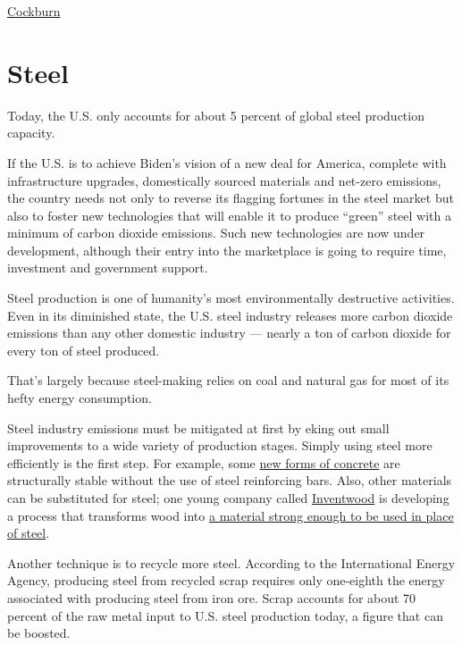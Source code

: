 \documentclass[
]{book}
\begin{document}
\href{https://www.independent.co.uk/climate-change/news/wood-construction-concrete-steel-climate-b1796342.html}{Cockburn}

\hypertarget{steel}{%
\chapter{Steel}\label{steel}}

Today, the U.S. only accounts for about 5 percent of global steel production capacity.

If the U.S. is to achieve Biden's vision of a new deal for America, complete with infrastructure upgrades, domestically sourced materials and net-zero emissions, the country needs not only to reverse its flagging fortunes in the steel market but also to foster new technologies that will enable it to produce ``green'' steel with a minimum of carbon dioxide emissions. Such new technologies are now under development, although their entry into the marketplace is going to require time, investment and government support.

Steel production is one of humanity's most environmentally destructive activities. Even in its diminished state, the U.S. steel industry releases more carbon dioxide emissions than any other domestic industry --- nearly a ton of carbon dioxide for every ton of steel produced.

That's largely because steel-making relies on coal and natural gas for most of its hefty energy consumption.

Steel industry emissions must be mitigated at first by eking out small improvements to a wide variety of production stages. Simply using steel more efficiently is the first step. For example,
some \href{https://energycentral.com/c/ec/new-innovation-drives-down-carbon-dioxide-emissions-cement}{new forms of concrete} are structurally stable without the use of steel reinforcing bars. Also, other materials can be substituted for steel;
one young company called \href{https://www.inventwood.com/}{Inventwood} is developing a process that transforms wood into \href{https://www.inventwood.com/mettlewood/}{a material strong enough to be used in place of steel}.

Another technique is to recycle more steel. According to the International Energy Agency, producing steel from recycled scrap requires only one-eighth the energy associated with producing steel from iron ore. Scrap accounts for about 70 percent of the raw metal input to U.S. steel production today, a figure that can be boosted.
\end{document}
